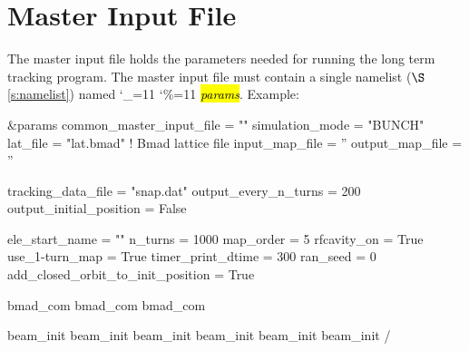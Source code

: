 \documentclass{hitec}
\newcommand\dottcmd[1]{\hl{\em#1}\endgroup}
\newcommand{\vn}{\begingroup\catcode`\_=11 \catcode`\%=11 \dottcmd}
\newcommand{\sref}[1]{$\S$\ref{#1}}
\newcommand{\Section}[1]{\section{#1}\vspace*{-1ex}}
\begin{document}
{{{{{{%
\Section{Master Input File}
\label{s:input}

The master input file holds the parameters needed for running the long term tracking program. The
master input file must contain a single namelist (\sref{s:namelist}) named \vn{params}.  Example:
\begin{code}
&params
  common_master_input_file = ""
  simulation_mode = "BUNCH"
  lat_file   =  "lat.bmad"     ! Bmad lattice file
  input_map_file = ''
  output_map_file = ''

  tracking_data_file  = "snap.dat"
  output_every_n_turns = 200
  output_initial_position = False

  ele_start_name     = ""
  n_turns            = 1000
  map_order          = 5
  rfcavity_on        = True
  use_1-turn_map     = True
  timer_print_dtime  = 300
  ran_seed           = 0
  add_closed_orbit_to_init_position = True

  bmad_com%
  bmad_com%
  bmad_com%

  beam_init%
  beam_init%
  beam_init%
  beam_init%
  beam_init%
  beam_init%
/
\end{code}

}}}}}}
\end{document}
